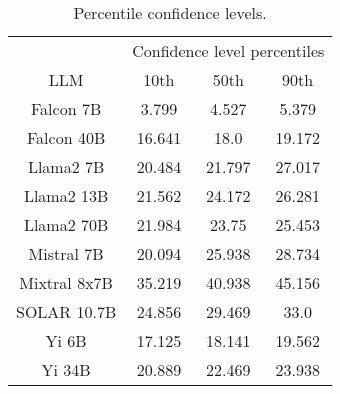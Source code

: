 \begin{table*}
\centering
\begin{tabular}{c|c|c|c}
& \multicolumn{3}{c}{Confidence level percentiles} \\ 
LLM & 10th & 50th & 90th\\ \hline
Falcon 7B & 3.799 & 4.527 & 5.379\\
Falcon 40B & 16.641 & 18.0 & 19.172\\
Llama2 7B & 20.484 & 21.797 & 27.017\\
Llama2 13B & 21.562 & 24.172 & 26.281\\
Llama2 70B & 21.984 & 23.75 & 25.453\\
Mistral 7B & 20.094 & 25.938 & 28.734\\
Mixtral 8x7B & 35.219 & 40.938 & 45.156\\
SOLAR 10.7B & 24.856 & 29.469 & 33.0\\
Yi 6B & 17.125 & 18.141 & 19.562\\
Yi 34B & 20.889 & 22.469 & 23.938\\
\hline
\end{tabular}
\caption{Percentile confidence levels.}
\label{tab:percentile_conf}
\end{table*}
